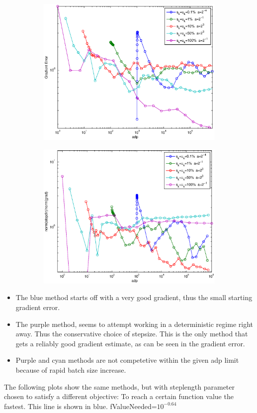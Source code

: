 \documentclass[12pt]{article}
\begin{document}
\begin{figure}[H]
\begin{subfigure}[b]{.5\linewidth}
	        \includegraphics[width=4in]{Figures/exp3.eps}
\end{subfigure}%
\begin{subfigure}[b]{.5\linewidth}
	        \includegraphics[width=4in]{Figures/exp4.eps}
\end{subfigure}%
\end{figure}

\begin{itemize}
	\item The blue method starts off with a very good gradient, thus the small starting gradient error.
	\item The purple method, seems to attempt working in a deterministic regime right away. Thus the conservative choice of stepsize. This is the only method that gets a reliably good gradient estimate, as can be seen in the gradient error.
	\item Purple and cyan methods are not competetive within the given adp limit because of rapid batch size increase.
\end{itemize}
	\newpage
	The following plots show the same methods, but with steplength parameter chosen to satisfy a different objective: To reach a certain function value the fastest. This line is shown in blue. fValueNeeded=$10^{-0.64}$
	
\end{document}
